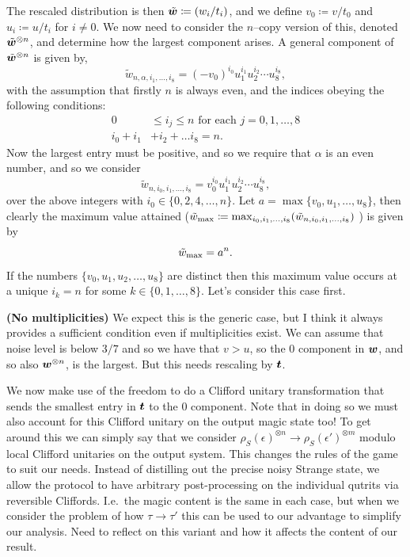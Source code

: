 \documentclass[pra,
aps,
twocolumn,
superscriptaddress,
groupedaddress,
nofootinbib,
reprint
]{revtex4-1}
\begin{document}
The rescaled distribution is then $\tilde{\boldsymbol{w}}\coloneqq (w_i/t_i)$, and we define $v_0 \coloneqq v/t_0$ and $u_i \coloneqq u/t_i$ for $i\ne 0$. We now need to consider the $n$--copy version of this, denoted $\tilde{\boldsymbol{w}}^{\otimes n}$, and determine how the largest component arises. A general component of $\tilde{\boldsymbol{w}}^{\otimes n}$ is given by,
\begin{equation}
\tilde{w}_{n,\alpha, i_1, \dots, i_8} = (-v_0)^{i_0} u_1^{i_1} u_2^{i_2} \cdots u_8^{i_8},
\end{equation}
with the assumption that firstly $n$ is always even, and the indices obeying the following conditions:
\begin{align}
0 &\le i_j \le n \mbox{ for each }j=0,1,\dots ,8 \nonumber \\
i_0+ i_1 &+ i_2 + \dots i_8 =n.
\end{align}
Now the largest entry must be positive, and so we require that $\alpha$ is an even number, and so we consider
\begin{equation}
\tilde{w}_{n,i_0, i_1, \dots, i_8} = v_0^{i_0} u_1^{i_1} u_2^{i_2} \cdots u_8^{i_8},
\end{equation}
over the above integers with $i_0 \in \{0,2,4, \dots, n\}$. Let $a = \max \{v_0, u_1, \dots ,u_8\}$, then clearly the maximum value attained ($\tilde{w}_{\rm max}\coloneqq \max_{i_0,i_1,\dots , i_8}(\tilde{w}_{n,i_0, i_1, \dots, i_8})$ ) is given by 
\begin{equation}
\tilde{w}_{\rm max} = a^n.
\end{equation}
If the numbers $\{v_0, u_1, u_2, \dots, u_8\}$ are distinct then this maximum value occurs at a unique $i_k=n$ for some $k \in \{0, 1, \dots, 8\}$. Let's consider this case first.

\textbf{(No multiplicities)} We expect this is the generic case, but I think it always provides a sufficient condition even if multiplicities exist. We can assume that noise level is below $3/7$ and so we have that $v >u$, so the $0$ component in $\boldsymbol{w}$, and so also $\boldsymbol{w}^{\otimes n}$, is the largest. But this needs rescaling by $\boldsymbol{t}$. 

We now make use of the freedom to do a Clifford unitary transformation that sends the smallest entry in $\boldsymbol{t}$ to the $0$ component. Note that in doing so we must also account for this Clifford unitary on the output magic state too! To get around this we can simply say that we consider $\rho_S(\epsilon )^{\otimes n} \rightarrow \rho_S(\epsilon')^{\otimes m}$ modulo local Clifford unitaries on the output system. This changes the rules of the game to suit our needs. Instead of distilling out the precise noisy Strange state, we allow the protocol to have arbitrary post-processing on the individual qutrits via reversible Cliffords. I.e.~the magic content is the same in each case, but when we consider the problem of how $\tau \rightarrow \tau'$ this can be used to our advantage to simplify our analysis. Need to reflect on this variant and how it affects the content of our result.
\end{document}
